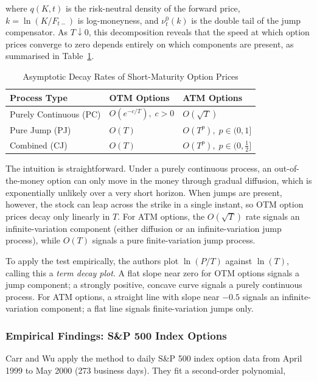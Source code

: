 \documentclass[12pt]{article}
\begin{document}
where $q(K,t)$ is the risk-neutral density of the forward price, $k=\ln(K/F_{t-})$
is log-moneyness, and $\nu_t^0(k)$ is the double tail of the jump compensator.
As $T\downarrow 0$, this decomposition reveals that the speed at which option
prices converge to zero depends entirely on which components are present, as
summarised in Table~\ref{tab:decay}.

\begin{table}[h]
\centering
\caption{Asymptotic Decay Rates of Short-Maturity Option Prices}
\label{tab:decay}
\begin{tabular}{lll}
\toprule
Process Type & OTM Options & ATM Options \\
\midrule
Purely Continuous (PC)  & $O(e^{-c/T}),\;c>0$ & $O(\sqrt{T})$ \\
Pure Jump (PJ)          & $O(T)$               & $O(T^p),\;p\in(0,1]$ \\
Combined (CJ)           & $O(T)$               & $O(T^p),\;p\in(0,\tfrac{1}{2}]$ \\
\bottomrule
\end{tabular}
\end{table}

The intuition is straightforward. Under a purely continuous process, an
out-of-the-money option can only move in the money through gradual
diffusion, which is exponentially unlikely over a very short horizon. When
jumps are present, however, the stock can leap across the strike in a single
instant, so OTM option prices decay only linearly in $T$. For ATM options,
the $O(\sqrt{T})$ rate signals an infinite-variation component (either diffusion
or an infinite-variation jump process), while $O(T)$ signals a pure finite-variation
jump process.

To apply the test empirically, the authors plot $\ln(P/T)$ against $\ln(T)$,
calling this a \textit{term decay plot}. A flat slope near zero for OTM options
signals a jump component; a strongly positive, concave curve signals a
purely continuous process. For ATM options, a straight line with slope
near $-0.5$ signals an infinite-variation component; a flat line signals
finite-variation jumps only.

\subsubsection*{Empirical Findings: S\&P 500 Index Options}

Carr and Wu apply the method to daily S\&P 500 index option data from
April 1999 to May 2000 (273 business days). They fit a second-order polynomial,
\end{document}
